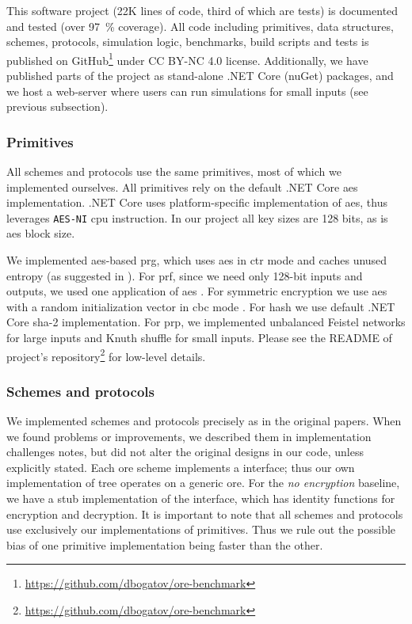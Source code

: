 		This software project (22K lines of code, third of which are tests) is documented and tested (over \SI{97}{\percent} coverage).
		All code including primitives, data structures, schemes, protocols, simulation logic, benchmarks, build scripts and tests is published on GitHub\footnote{\url{https://github.com/dbogatov/ore-benchmark}} under CC BY-NC 4.0 license.
		Additionally, we have published parts of the project as stand-alone {.NET Core} (nuGet) packages, and we host a web-server where users can run simulations for small inputs (see previous subsection).

		\subsubsection{Primitives}

			All schemes and protocols use the same primitives, most of which we implemented ourselves.
			All primitives rely on the default {.NET Core} \acrshort{aes} implementation.
			{.NET Core} uses platform-specific implementation of \acrshort{aes}, thus leverages \texttt{AES-NI} \acrshort{cpu} instruction.
			In our project all key sizes are 128 bits, as is \acrshort{aes} block size.

			We implemented \acrshort{aes}-based \acrshort{prg}, which uses \acrshort{aes} \cite{aes-nist} in \acrshort{ctr} mode \cite{nist-modes} and caches unused entropy (as suggested in \cite{aes-ctr-rfc}).
			For \acrshort{prf}, since we need only 128-bit inputs and outputs, we used one application of \acrshort{aes} \cite[Proposition 3.27]{intro-to-modern-crypto}.
			For symmetric encryption we use \acrshort{aes} with a random initialization vector in \acrshort{cbc} mode \cite[Section 3.6.2]{intro-to-modern-crypto}.
			For hash we use default {.NET Core} \acrshort{sha}-2 implementation.
			For \acrshort{prp}, we implemented unbalanced Feistel networks \cite{unbalanced-feistel} for large inputs and Knuth shuffle \cite{knuth-shuffle} for small inputs.
			Please see the README of project's repository\footnote{\url{https://github.com/dbogatov/ore-benchmark}} for low-level details.

			

		\subsubsection{Schemes and protocols}

			We implemented schemes and protocols precisely as in the original papers.
			When we found problems or improvements, we described them in implementation challenges notes, but did not alter the original designs in our code, unless explicitly stated.
			Each \acrshort{ore} scheme implements a {\Csharp} interface; thus our own implementation of {\BPlus} tree operates on a generic \acrshort{ore}.
			For the \emph{no encryption} baseline, we have a stub implementation of the interface, which has identity functions for encryption and decryption.
			It is important to note that all schemes and protocols use exclusively our implementations of primitives.
			Thus we rule out the possible bias of one primitive implementation being faster than the other.

